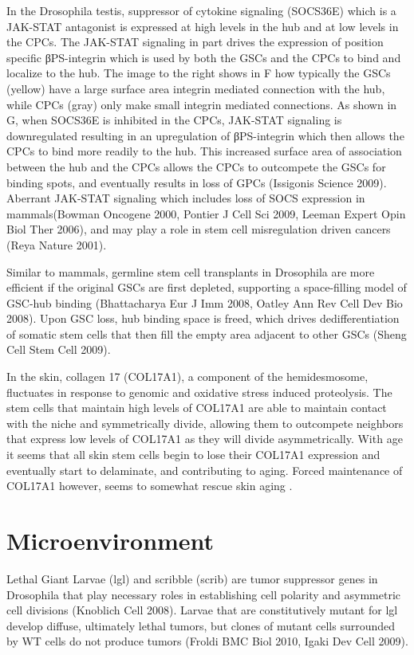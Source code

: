 \documentclass[]{book}
\begin{document}
In the Drosophila testis, suppressor of cytokine signaling (SOCS36E)
which is a JAK-STAT antagonist is expressed at high levels in the hub
and at low levels in the CPCs. The JAK-STAT signaling in part drives the
expression of position specific βPS-integrin which is used by both the
GSCs and the CPCs to bind and localize to the hub. The image to the
right shows in F how typically the GSCs (yellow) have a large surface
area integrin mediated connection with the hub, while CPCs (gray) only
make small integrin mediated connections. As shown in G, when SOCS36E is
inhibited in the CPCs, JAK-STAT signaling is downregulated resulting in
an upregulation of βPS-integrin which then allows the CPCs to bind more
readily to the hub. This increased surface area of association between
the hub and the CPCs allows the CPCs to outcompete the GSCs for binding
spots, and eventually results in loss of GPCs (Issigonis Science 2009).
Aberrant JAK-STAT signaling which includes loss of SOCS expression in
mammals(Bowman Oncogene 2000, Pontier J Cell Sci 2009, Leeman Expert
Opin Biol Ther 2006), and may play a role in stem cell misregulation
driven cancers (Reya Nature 2001).

Similar to mammals, germline stem cell transplants in Drosophila are
more efficient if the original GSCs are first depleted, supporting a
space-filling model of GSC-hub binding (Bhattacharya Eur J Imm 2008,
Oatley Ann Rev Cell Dev Bio 2008). Upon GSC loss, hub binding space is
freed, which drives dedifferentiation of somatic stem cells that then
fill the empty area adjacent to other GSCs (Sheng Cell Stem Cell 2009).

In the skin, collagen 17 (COL17A1), a component of the hemidesmosome,
fluctuates in response to genomic and oxidative stress induced
proteolysis. The stem cells that maintain high levels of COL17A1 are
able to maintain contact with the niche and symmetrically divide,
allowing them to outcompete neighbors that express low levels of COL17A1
as they will divide asymmetrically. With age it seems that all skin stem
cells begin to lose their COL17A1 expression and eventually start to
delaminate, and contributing to aging. Forced maintenance of COL17A1
however, seems to somewhat rescue skin aging \citep{liu2019stem}.

\section{Microenvironment}\label{microenvironment}

Lethal Giant Larvae (lgl) and scribble (scrib) are tumor suppressor
genes in Drosophila that play necessary roles in establishing cell
polarity and asymmetric cell divisions (Knoblich Cell 2008). Larvae that
are constitutively mutant for lgl develop diffuse, ultimately lethal
tumors, but clones of mutant cells surrounded by WT cells do not produce
tumors (Froldi BMC Biol 2010, Igaki Dev Cell 2009).
\end{document}

